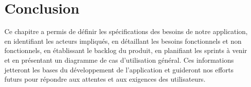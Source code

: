 \section{Conclusion}

Ce chapitre a permis de définir les spécifications des besoins de notre application, en identifiant les acteurs impliqués, en détaillant les besoins fonctionnels et non fonctionnels, en établissant le backlog du produit, en planifiant les sprints à venir et en présentant un diagramme de cas d'utilisation général. Ces informations jetteront les bases du développement de l'application et guideront nos efforts futurs pour répondre aux attentes et aux exigences des utilisateurs.
